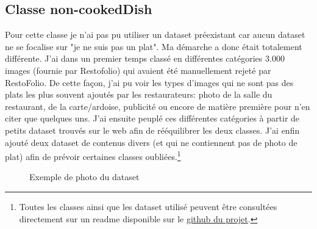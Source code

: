 \documentclass[a4paper,12pt]{report}
\begin{document}
      \subsection{Classe non-cookedDish}
      Pour cette classe je n'ai pas pu utiliser un dataset préexistant car aucun dataset ne se focalise sur "je ne suis pas un plat". Ma démarche a donc était totalement différente.
      \medbreak
      J'ai dans un premier temps classé en différentes catégories 3.000 images (fournie par Restofolio) qui avaient été manuellement rejeté par RestoFolio. De cette façon, j'ai pu voir les types d'images qui ne sont pas des plats les plus souvent ajoutés par les restaurateurs: photo de la salle du restaurant, de la carte/ardoise, publicité ou encore de matière première pour n'en citer que quelques uns.
      \medbreak
      J'ai ensuite peuplé ces différentes catégories à partir de petits dataset trouvés sur le web afin de rééquilibrer les deux classes. J'ai enfin ajouté deux dataset de contenus divers (et qui ne contiennent pas de photo de plat) afin de prévoir certaines classes oubliées.\footnote{Toutes les classes ainsi que les dataset utilisé peuvent être consultées directement sur un readme disponible sur le \href{<https://github.com/plabadille/cookedDishRecognizer/blob/master/data-set/dataset_notCookedDish.txt>}{github du projet}.}
      \medbreak
      \begin{figure}[!h]%
        \centering
        \qquad
        \qquad
        \caption{Exemple de photo du dataset}%
      \end{figure}%
\end{document}
